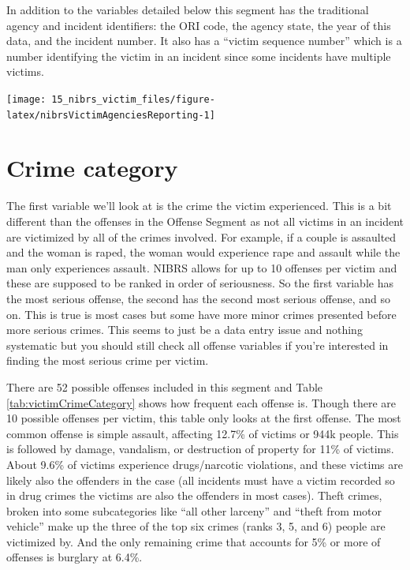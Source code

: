 \documentclass[
]{krantz}
\let\origfigure\figure
\let\endorigfigure\endfigure
\renewenvironment{figure}[1][2] {
    \expandafter\origfigure\expandafter[H]
} {
    \endorigfigure
}
\begin{document}
In addition to the variables detailed below this segment has
the traditional agency and incident identifiers: the ORI
code, the agency state, the year of this data, and the
incident number. It also has a ``victim sequence number''
which is a number identifying the victim in an incident
since some incidents have multiple victims.

\begin{figure}

{\centering \texttt{[image: 15\_nibrs\_victim\_files/figure-latex/nibrsVictimAgenciesReporting-1]} 

}

\caption{The annual number of agencies reporting data in the NIBRS Victim Segment, 1991-2022.}\label{fig:nibrsVictimAgenciesReporting}
\end{figure}

\section{Crime category}\label{crime-category-1}

The first variable we'll look at is the crime the victim
experienced. This is a bit different than the offenses in
the Offense Segment as not all victims in an incident are
victimized by all of the crimes involved. For example, if a
couple is assaulted and the woman is raped, the woman would
experience rape and assault while the man only experiences
assault. NIBRS allows for up to 10 offenses per victim and
these are supposed to be ranked in order of seriousness. So
the first variable has the most serious offense, the second
has the second most serious offense, and so on. This is true
is most cases but some have more minor crimes presented
before more serious crimes. This seems to just be a data
entry issue and nothing systematic but you should still
check all offense variables if you're interested in finding
the most serious crime per victim.

There are 52 possible offenses included in this segment and
Table \ref{tab:victimCrimeCategory} shows how frequent each
offense is. Though there are 10 possible offenses per
victim, this table only looks at the first offense. The most
common offense is simple assault, affecting 12.7\% of
victims or 944k people. This is followed by damage,
vandalism, or destruction of property for 11\% of victims.
About 9.6\% of victims experience drugs/narcotic violations,
and these victims are likely also the offenders in the case
(all incidents must have a victim recorded so in drug crimes
the victims are also the offenders in most cases). Theft
crimes, broken into some subcategories like ``all other
larceny'' and ``theft from motor vehicle'' make up the three
of the top six crimes (ranks 3, 5, and 6) people are
victimized by. And the only remaining crime that accounts
for 5\% or more of offenses is burglary at 6.4\%.
\end{document}
